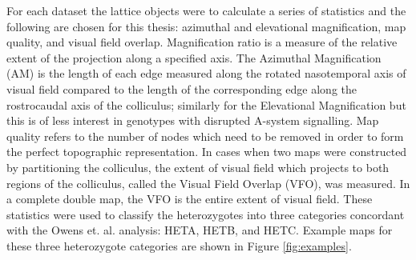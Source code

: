 For each dataset the lattice objects were to calculate a series of statistics and the following are chosen for this thesis: azimuthal and elevational magnification, map quality, and visual field overlap. Magnification ratio is a measure of the relative extent of the projection along a specified axis. The Azimuthal Magnification (AM) is the length of each edge measured along the rotated nasotemporal axis of visual field compared to the length of the corresponding edge along the rostrocaudal axis of the colliculus; similarly for the Elevational Magnification but this is of less interest in genotypes with disrupted A-system signalling.  Map quality refers to the number of nodes which need to be removed in order to form the perfect topographic representation. In cases when two maps were constructed by partitioning the colliculus, the extent of visual field which projects to both regions of the colliculus, called the Visual Field Overlap (VFO), was measured. In a complete double map, the VFO is the entire extent of visual field. These statistics were used to classify the heterozygotes into three categories concordant with the Owens et. al. analysis: HETA, HETB, and HETC. Example maps for these three heterozygote categories are shown in Figure \ref{fig:examples}.

